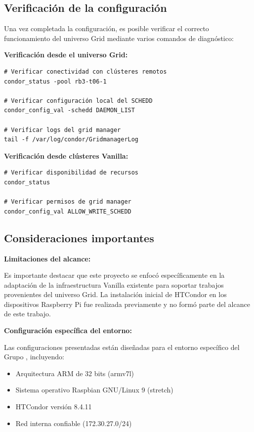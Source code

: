 \FloatBarrier\subsection{Verificación de la configuración}

Una vez completada la configuración, es posible verificar el correcto funcionamiento del universo Grid mediante varios comandos de diagnóstico:

\textbf{Verificación desde el universo Grid:}

\begin{verbatim}
# Verificar conectividad con clústeres remotos
condor_status -pool rb3-t06-1

# Verificar configuración local del SCHEDD
condor_config_val -schedd DAEMON_LIST

# Verificar logs del grid manager
tail -f /var/log/condor/GridmanagerLog
\end{verbatim}

\textbf{Verificación desde clústeres Vanilla:}

\begin{verbatim}
# Verificar disponibilidad de recursos
condor_status

# Verificar permisos de grid manager
condor_config_val ALLOW_WRITE_SCHEDD
\end{verbatim}

\FloatBarrier\subsection{Consideraciones importantes}

\textbf{Limitaciones del alcance:}

Es importante destacar que este proyecto se enfocó específicamente en la adaptación de la infraestructura Vanilla existente para soportar trabajos provenientes del universo Grid. La instalación inicial de HTCondor en los dispositivos Raspberry Pi fue realizada previamente y no formó parte del alcance de este trabajo.

\textbf{Configuración específica del entorno:}

Las configuraciones presentadas están diseñadas para el entorno específico del Grupo \GRID, incluyendo:

\begin{itemize}
	\item Arquitectura ARM de 32 bits (armv7l)
	\item Sistema operativo Raspbian GNU/Linux 9 (stretch)
	\item HTCondor versión 8.4.11
	\item Red interna confiable (172.30.27.0/24)
\end{itemize}

